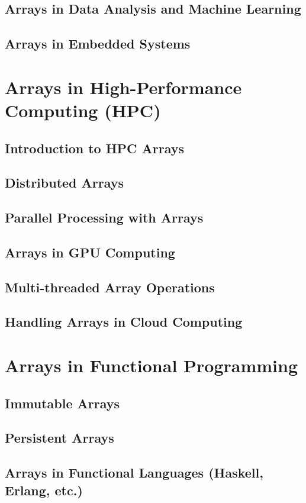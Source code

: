 \documentclass[12pt, oneside]{book}
\begin{document}
\section{Arrays in Data Analysis and Machine Learning}
\section{Arrays in Embedded Systems}

\chapter{Arrays in High-Performance Computing (HPC)}
\section{Introduction to HPC Arrays}
\section{Distributed Arrays}
\section{Parallel Processing with Arrays}
\section{Arrays in GPU Computing}
\section{Multi-threaded Array Operations}
\section{Handling Arrays in Cloud Computing}

\chapter{Arrays in Functional Programming}
\section{Immutable Arrays}
\section{Persistent Arrays}
\section{Arrays in Functional Languages (Haskell, Erlang, etc.)}
\end{document}
